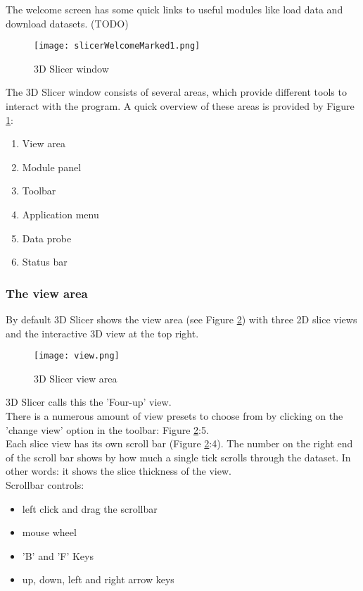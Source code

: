 The welcome screen has some quick links to useful modules like load data and download datasets. (TODO)
\pagebreak
\begin{figure}[h!] %
	\centerline{ %
		\texttt{[image: slicerWelcomeMarked1.png]}}
	\caption{3D Slicer window}
	\label{fig:slicerView}
\end{figure}

\noindent
The 3D Slicer window consists of several areas, which provide different tools to interact with the program.
A quick overview of these areas is provided by Figure \ref{fig:slicerView}:
\begin{enumerate}
	\item View area
	\item Module panel
	\item Toolbar
	\item Application menu
	\item Data probe
	\item Status bar
\end{enumerate}



\pagebreak
\subsubsection{ The view area }
By default 3D Slicer shows the view area (see Figure \ref{fig:4upview}) with three 2D slice views and the interactive 3D view at the top right.\\
\noindent
\begin{figure}[h!] %
	\centerline{ %
		\texttt{[image: view.png]}}
	\caption{3D Slicer view area}
	\label{fig:4upview}
\end{figure}

\noindent
3D Slicer calls this the 'Four-up' view.\\

\noindent
There is a numerous amount of view presets to choose from by clicking on the 'change view' option in the toolbar: Figure \ref{fig:4upview}:5.\\

\noindent
Each slice view has its own scroll bar (Figure \ref{fig:4upview}:4).
The number on the right end of the scroll bar shows by how much a single tick scrolls through the dataset.
In other words: it shows the slice thickness of the view.\\
\noindent
Scrollbar controls:
\begin{itemize}
	\item left click and drag the scrollbar
	\item mouse wheel
	\item 'B' and 'F' Keys
	\item up, down, left and right arrow keys
\end{itemize}

